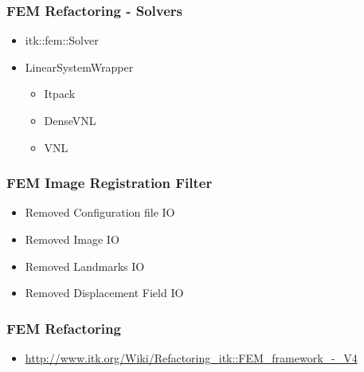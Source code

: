 {
\begin{frame}
\frametitle{FEM Refactoring - Solvers}
\large
\begin{itemize}
\item itk::fem::Solver
\pause
\item LinearSystemWrapper
\begin{itemize}
\item Itpack
\item DenseVNL
\item VNL
\end{itemize}
\end{itemize}
\end{frame}
}


{
\begin{frame}
\frametitle{FEM Image Registration Filter}
\large
\begin{itemize}
\item Removed Configuration file IO
\pause
\item Removed Image IO
\pause
\item Removed Landmarks IO
\pause
\item Removed Displacement Field IO
\end{itemize}
\end{frame}
}



{
\begin{frame}
\frametitle{FEM Refactoring}
\begin{itemize}
\item \url{http://www.itk.org/Wiki/Refactoring_itk::FEM_framework_-_V4}
\end{itemize}
\end{frame}
}
